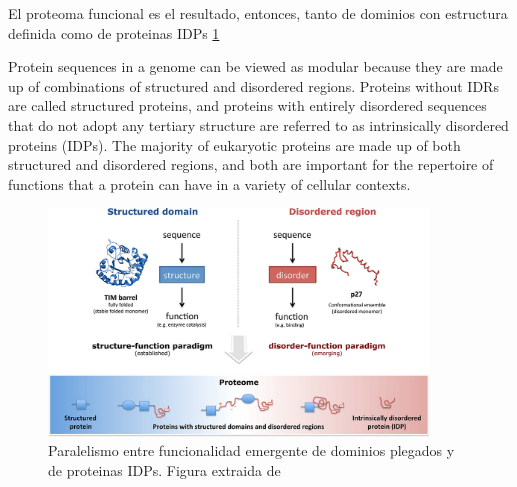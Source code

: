 
El proteoma funcional es el resultado, entonces, tanto de dominios con estructura definida como de proteinas IDPs \ref{stuctured-idp-functions}

Protein sequences in a genome can be viewed as modular because they are made up of combinations of structured and disordered regions.
Proteins without IDRs are called structured proteins, and proteins with entirely disordered sequences that do not adopt any tertiary
structure are referred to as intrinsically disordered proteins (IDPs). 
The majority of eukaryotic proteins are made up of both structured and disordered regions, and both are important for the
repertoire of functions that a protein can have in a variety of cellular contexts.



\begin{figure}[h!,centered]
\centering
\includegraphics[width=0.9\textwidth]{img/structure-idp-function.jpeg} 
\caption{Paralelismo entre funcionalidad emergente de dominios plegados y de proteinas IDPs. Figura extraida de \cite{van2014classification}}
\label{stuctured-idp-functions}
\end{figure}


